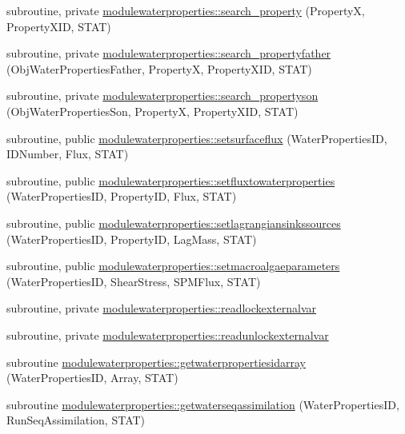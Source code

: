 \begin{DoxyCompactItemize}
\item 
subroutine, private \mbox{\hyperlink{namespacemodulewaterproperties_ae6b7d758da27fb15faee52b3ed14029d}{modulewaterproperties\+::search\+\_\+property}} (PropertyX, Property\+X\+ID, S\+T\+AT)
\item 
subroutine, private \mbox{\hyperlink{namespacemodulewaterproperties_a1dec5db35cff13d783df415f7991aff7}{modulewaterproperties\+::search\+\_\+propertyfather}} (Obj\+Water\+Properties\+Father, PropertyX, Property\+X\+ID, S\+T\+AT)
\item 
subroutine, private \mbox{\hyperlink{namespacemodulewaterproperties_afdb62b42fe2bd1edafce470c06060ee4}{modulewaterproperties\+::search\+\_\+propertyson}} (Obj\+Water\+Properties\+Son, PropertyX, Property\+X\+ID, S\+T\+AT)
\item 
subroutine, public \mbox{\hyperlink{namespacemodulewaterproperties_a2550f7996bf177225c3f5a9830c86707}{modulewaterproperties\+::setsurfaceflux}} (Water\+Properties\+ID, I\+D\+Number, Flux, S\+T\+AT)
\item 
subroutine, public \mbox{\hyperlink{namespacemodulewaterproperties_a5d755fdb3bd199311d38f1f88cbd7f10}{modulewaterproperties\+::setfluxtowaterproperties}} (Water\+Properties\+ID, Property\+ID, Flux, S\+T\+AT)
\item 
subroutine, public \mbox{\hyperlink{namespacemodulewaterproperties_a829c556b5c2c23f02481f958f56e77b2}{modulewaterproperties\+::setlagrangiansinkssources}} (Water\+Properties\+ID, Property\+ID, Lag\+Mass, S\+T\+AT)
\item 
subroutine, public \mbox{\hyperlink{namespacemodulewaterproperties_a04f02aae382274eb3a7fb04e8be06e48}{modulewaterproperties\+::setmacroalgaeparameters}} (Water\+Properties\+ID, Shear\+Stress, S\+P\+M\+Flux, S\+T\+AT)
\item 
subroutine, private \mbox{\hyperlink{namespacemodulewaterproperties_a463922f7665f0f3507bff58df80af6f7}{modulewaterproperties\+::readlockexternalvar}}
\item 
subroutine, private \mbox{\hyperlink{namespacemodulewaterproperties_ac4ba6844cdc46e6fc258842be3a9e82b}{modulewaterproperties\+::readunlockexternalvar}}
\item 
subroutine \mbox{\hyperlink{namespacemodulewaterproperties_a3d2d1a142ceb72d246c0254f29e4595c}{modulewaterproperties\+::getwaterpropertiesidarray}} (Water\+Properties\+ID, Array, S\+T\+AT)
\item 
subroutine \mbox{\hyperlink{namespacemodulewaterproperties_afd2b779c6911ab6d6436d6d813a338c7}{modulewaterproperties\+::getwaterseqassimilation}} (Water\+Properties\+ID, Run\+Seq\+Assimilation, S\+T\+AT)

\end{DoxyCompactItemize}
